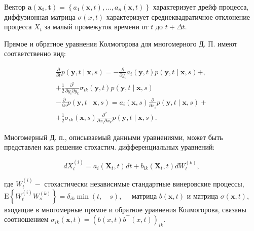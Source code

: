 \documentclass[10pt]{article}
\begin{document}
Вектор $\boldsymbol{a}\left(\boldsymbol{x}_{\boldsymbol{t}}, \boldsymbol{t}\right)=\left\{a_{1}(\boldsymbol{x}, t), \ldots, a_{n}(\boldsymbol{x}, t)\right\}$ характеризует дрейф процесса, диффузионная матрица $\sigma(x, t)$ характеризует среднеквадратичное отклонение процесса $X_{t}$ за малый промежуток времени от $t$ до $t+\Delta t$.



Прямое и обратное уравнения Колмогорова для многомерного Д. П. имеют соответственно вид:



\[

\begin{gathered}

\frac{\partial}{\partial t} p(\boldsymbol{y}, t \mid \boldsymbol{x}, s)=-\frac{\partial}{\partial y_{i}} a_{i}(\boldsymbol{y}, t) p(\boldsymbol{y}, t \mid \boldsymbol{x}, s)+, \\

+\frac{1}{2} \frac{\partial^{2}}{\partial y_{i} \partial y_{k}} \sigma_{i k}(\boldsymbol{y}, t) p(\boldsymbol{y}, t \mid \boldsymbol{x}, s) \\

-\frac{\partial}{\partial s} p(\boldsymbol{y}, t \mid \boldsymbol{x}, s)=a_{i}(\boldsymbol{x}, s) \frac{\partial}{\partial x_{i}} p(\boldsymbol{y}, t \mid \boldsymbol{x}, s)+ \\

+\frac{1}{2} \sigma_{i k}(\boldsymbol{x}, s) \frac{\partial^{2}}{\partial x_{i} \partial x_{k}} p(\boldsymbol{y}, t \mid \boldsymbol{x}, s) .

\end{gathered}

\]



Многомерный Д. п., описываемый данными уравнениями, может быть представлен как решение стохастич. дифференциальных уравнений:



\[

d X_{t}^{(i)}=a_{i}\left(\boldsymbol{X}_{t}, t\right) d t+b_{i k}\left(\boldsymbol{X}_{t}, t\right) d W_{t}^{(k)},

\]



где $W_{t}^{(i)}-$ стохастически независимые стандартные винеровские процессы, $\mathrm{E}\left\{W_{t}^{(i)} W_{s}^{(k)}\right\}=\delta_{i k} \min (t, \quad s), \quad$ матрица $b(\boldsymbol{x}, t)$ и матрица $\sigma(\boldsymbol{x}, t)$, входящие в многомерные прямое и обратное уравнения Колмогорова, связаны соотношением $\sigma_{i k}(\boldsymbol{x}, t)=\left(b(x, t) b^{\top}(x, t)\right)_{i k}$.
\end{document}

